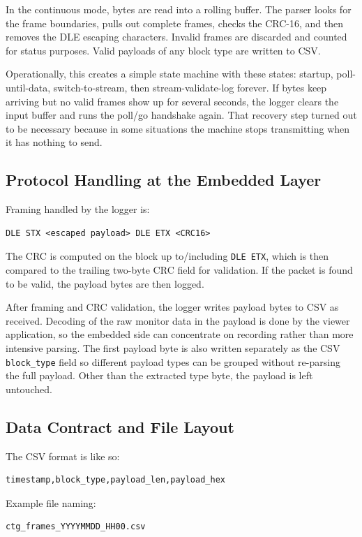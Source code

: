 \documentclass[11pt]{article}
\begin{document}
In the continuous mode, bytes are read into a rolling buffer. The parser looks for the frame boundaries, pulls out complete frames, checks the CRC-16, and then removes the DLE escaping characters. Invalid frames are discarded and counted for status purposes. Valid payloads of any block type are written to CSV.

Operationally, this creates a simple state machine with these states: startup, poll-until-data, switch-to-stream, then stream-validate-log forever. If bytes keep arriving but no valid frames show up for several seconds, the logger clears the input buffer and runs the poll/go handshake again. That recovery step turned out to be necessary because in some situations the machine stops transmitting when it has nothing to send.

\subsection*{Protocol Handling at the Embedded Layer}
Framing handled by the logger is:
\begin{verbatim}
DLE STX <escaped payload> DLE ETX <CRC16>
\end{verbatim}

The CRC is computed on the block up to/including \texttt{DLE ETX}, which is then compared to the trailing two-byte CRC field for validation. If the packet is found to be valid, the payload bytes are then logged.

After framing and CRC validation, the logger writes payload bytes to CSV as received. Decoding of the raw monitor data in the payload is done by the viewer application, so the embedded side can concentrate on recording rather than more intensive parsing. The first payload byte is also written separately as the CSV \texttt{block\_type} field so different payload types can be grouped without re-parsing the full payload. Other than the extracted type byte, the payload is left untouched.

\subsection*{Data Contract and File Layout}
The CSV format is like so:
\begin{verbatim}
timestamp,block_type,payload_len,payload_hex
\end{verbatim}

Example file naming:
\begin{verbatim}
ctg_frames_YYYYMMDD_HH00.csv
\end{verbatim}
\end{document}
